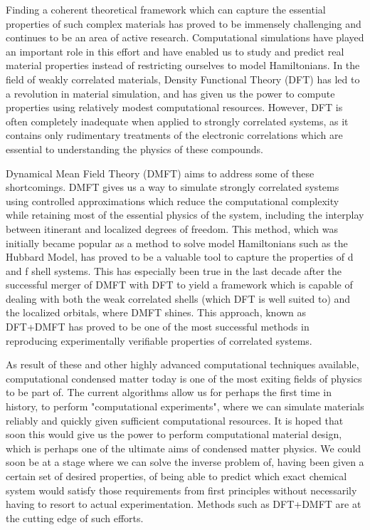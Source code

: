 \documentclass[12pt,a4paper]{article}
\begin{document}
Finding a coherent theoretical framework which can capture the essential properties of such complex materials has proved to be immensely challenging and continues to be an area of active research. Computational simulations have played an important role in this effort and have enabled us to study and predict real material properties instead of restricting ourselves to model Hamiltonians. In the field of weakly correlated materials, Density Functional Theory (DFT) has led to a revolution in material simulation, and has given us the power to compute properties using relatively modest computational resources. However, DFT is often completely inadequate when applied to strongly correlated systems, as it contains only rudimentary treatments of the electronic correlations which are essential to understanding the physics of these compounds.

Dynamical Mean Field Theory (DMFT) aims to address some of these shortcomings. DMFT gives us a way to simulate strongly correlated systems using controlled approximations which reduce the computational complexity while retaining most of the essential physics of the system, including the interplay between itinerant and localized degrees of freedom. This method, which was initially became popular as a method to solve model Hamiltonians such as the Hubbard Model, has proved to be a valuable tool to capture the properties of d and f shell systems. This has especially been true in the last decade after the successful merger of DMFT with DFT to yield a framework which is capable of dealing with both the weak correlated shells (which DFT is well suited to) and the localized orbitals, where DMFT shines. This approach, known as DFT+DMFT has proved to be one of the most successful methods in reproducing experimentally verifiable properties of correlated systems.

As result of these and other highly advanced computational techniques available, computational condensed matter today is one of the most exiting fields of physics to be part of. The current algorithms allow us for perhaps the first time in history, to perform "computational experiments", where we can simulate materials reliably and quickly given sufficient computational resources. It is hoped that soon this would give us the power to perform computational material design, which is perhaps one of the ultimate aims of condensed matter physics. We could soon be at a stage where we can solve the inverse problem of, having been given a certain set of desired properties, of being able to predict which exact chemical system would satisfy those requirements from first principles without necessarily having to resort to actual experimentation. Methods such as DFT+DMFT are at the cutting edge of such efforts. 
\end{document}

